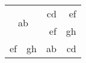 \documentclass{article}
\begin{document}
\begin{tabular}{c|l|r|r}
    \hline
    \multicolumn{2}{c|}{\multirow{2}{*}{ab}} & {cd} &{ef}\\
    \cline{3-4}
    \multicolumn{2}{c|}{} & ef & gh \\
    \hline
    ef & gh & ab & cd \\ 
    \hline 
\end{tabular}
\end{document}
